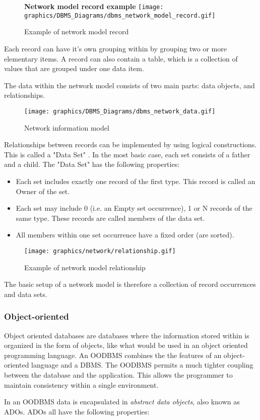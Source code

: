 \documentclass[letterpaper, 12pt]{article}
\begin{document}
\begin{figure}
  \centering
  \textbf{Network model record example}
  \texttt{[image: graphics/DBMS\_Diagrams/dbms\_network\_model\_record.gif]}
  \caption{Example of network model record}
  \cite{network_model_coronet}
\end{figure}

Each record can have it's own grouping within by grouping two or more elementary items.
A record can also contain a table, which is a collection of values that are grouped 
under one data item. 
\par\vspace{\baselineskip}
The data within the network model consists of two main parts: data objects, and
relationships.
 
\begin{figure}
  \centering
  \texttt{[image: graphics/DBMS\_Diagrams/dbms\_network\_data.gif]}
  \caption{Network information model}
  \cite{network_model_coronet}
\end{figure}

Relationships between records can be implemented by using logical constructions. 
This is called a "Data Set" . In the most basic case, each set consists of a father 
and a child. The "Data Set" has the following properties: 

\begin{itemize}
  \item Each set includes exactly one record of the first type. This record is called an Owner of the set.
  \item Each set may include 0 (i.e. an Empty set occurrence), 1 or N records of the same type. These records are called members of the data set.
  \item All members within one set occurrence have a fixed order (are sorted).
\end{itemize}

\begin{figure}
  \centering
  \texttt{[image: graphics/network/relationship.gif]}
  \caption{Example of network model relationship}
\end{figure}

The basic setup of a network model is therefore a collection of record occurrences and
data sets. 

\subsubsection{Object-oriented}
Object oriented databases are databases where the information stored within is organized
in the form of objects, like what would be used in an object oriented programming
language. An OODBMS combines the the features of an object-oriented language and a
DBMS. The OODBMS permits a much tighter coupling between the database and the application. This allows the programmer to maintain consistency within a single environment. 
\par\vspace{\baselineskip}
In an OODBMS data is encapsulated in \textit{abstract data objects}, also known 
as ADOs. ADOs all have the following properties: 
\end{document}
